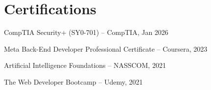 \documentclass[a4paper,11pt]{article}
\begin{document}
\section{Certifications}
\begin{description}[font=$\bullet$,leftmargin=*]
  \item {CompTIA Security+ (SY0-701) -- CompTIA, Jan 2026}
  \vspace{-5pt}
  \item {Meta Back-End Developer Professional Certificate -- Coursera, 2023}
  \vspace{-5pt}
  \item {Artificial Intelligence Foundations -- NASSCOM, 2021}
  \vspace{-5pt}
  \item {The Web Developer Bootcamp -- Udemy, 2021}
\end{description}
\end{document}
